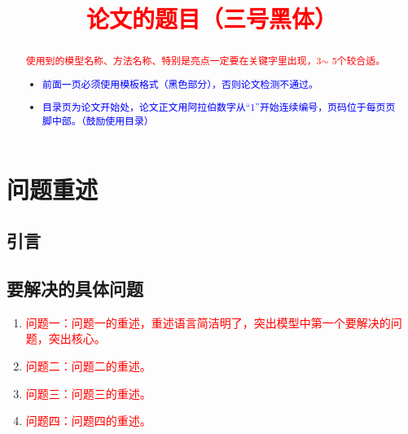 \documentclass[a4paper]{nmmcm}
\title{\textcolor{red}{论文的题目（三号黑体）}}
\date{}
\begin{document}
\begin{abstract}


\begin{keywords}
{\song\xiaosihao
\textcolor{red}{使用到的模型名称、方法名称、特别是亮点一定要在关键字里出现，3$\sim$ 5个较合适。}}
\end{keywords}

\begin{itemize}
  \item \textcolor{blue}{前面一页必须使用模板格式（黑色部分），否则论文检测不通过。}
  \item \textcolor{blue}{ 目录页为论文开始处，论文正文用阿拉伯数字从“1”开始连续编号，页码位于每页页脚中部。（鼓励使用目录）}
\end{itemize}

\end{abstract}
\maketitle 
\tableofcontents

\newpage
\setcounter{page}{1}
\pagestyle{fancy}

\section{问题重述}
\subsection{引言}


\subsection{要解决的具体问题}
\begin{enumerate}
  \item \textcolor{red}{问题一：问题一的重述，重述语言简洁明了，突出模型中第一个要解决的问题，突出核心。}
  \item \textcolor{red}{问题二：问题二的重述。}
  \item \textcolor{red}{问题三：问题三的重述。}
  \item \textcolor{red}{问题四：问题四的重述。}
\end{enumerate}

\end{document}

